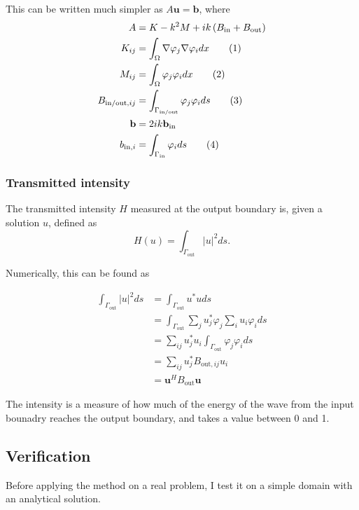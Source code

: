 \documentclass[aps, 12pt]{revtex4}
\newcommand\numberthis{\addtocounter{equation}{1}\tag{\theequation}}
\begin{document}
This can be written much simpler as $A\mathbf{u}=\mathbf{b}$, where
\begin{align*}
    A                     & = K - k^2M + ik\left(B_{\text{in}}+B_{\text{out}}\right)
    \\
    K_{ij}                & = \int_{\Omega}\nabla \varphi_j\nabla\varphi_idx \numberthis{} \label{eq:mat_K}
    \\
    M_{ij}                & = \int_{\Omega}\varphi_j\varphi_idx  \label{eq:mat_M} \numberthis{}
    \\
    B_{\text{in/out}, ij} & = \int_{\Gamma_{\text{in/out}}}\varphi_j\varphi_ids  \label{eq:mat_B} \numberthis{}
    \\
    \mathbf{b}            & = 2ik\mathbf{b}_{\text{in}}
    \\
    b_{\text{in}, i}      & = \int_{\Gamma_{\text{in}}}\varphi_ids  \label{eq:mat_b} \numberthis{}
\end{align*}

\subsubsection{Transmitted intensity}
The transmitted intensity $H$ measured at the output boundary is, given a solution $u$, defined as
\begin{equation*}
    H(u) = \int_{\Gamma_{\text{out}}}|u|^2ds.
\end{equation*}

Numerically, this can be found as

\begin{align*}
    \int_{\Gamma_{\text{out}}}|u|^2ds & = \int_{\Gamma_{\text{out}}}u^*uds
    \\ &= \int_{\Gamma_{\text{out}}} \sum_ju_j^*\varphi_j\sum_iu_i\varphi_ids
    \\
                                      & = \sum_{ij}u_j^*u_i\int_{\Gamma_{\text{out}}}\varphi_j\varphi_ids
    \\ &= \sum_{ij}u_j^*B_{\text{out}, ij}u_i
    \\ &= \mathbf{u}^HB_{\text{out}}\mathbf{u}
\end{align*}

The intensity is a measure of how much of the energy of the wave from the input bounadry reaches the output boundary, and takes a value between 0 and 1.


\subsection{Verification}
Before applying the method on a real problem, I test it on a simple domain with an analytical solution.
\end{document}
